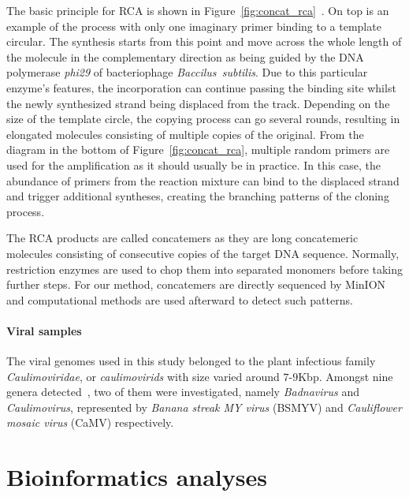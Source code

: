The basic principle for RCA is shown in Figure~\ref{fig:concat_rca}~\cite{Johne2009rca}.
On top is an example of the process with only one imaginary primer binding to a template circular. The synthesis starts from this point and move across the whole length of the molecule in the complementary direction as being guided by the DNA polymerase  \emph{phi29} of bacteriophage \emph{Baccilus~subtilis}.
Due to this particular enzyme's features, the incorporation can continue passing the binding site whilst the newly synthesized strand being displaced from the track.
Depending on the size of the template circle, the copying process can go several rounds, resulting in elongated molecules consisting of multiple copies of the original.
From the diagram in the bottom of Figure~\ref{fig:concat_rca}, multiple random primers are used for the amplification as it should usually be in practice. In this case, the abundance of primers from the reaction mixture can bind to the displaced strand and trigger additional syntheses, creating the branching patterns of the cloning process.

The RCA products are called concatemers as they are long concatemeric molecules consisting of consecutive copies of the target DNA sequence. Normally, restriction enzymes are used to chop them into separated monomers before taking further steps. For our method, concatemers are directly sequenced by MinION and computational methods are used afterward to detect such patterns.
\paragraph{Viral samples}
The viral genomes used in this study belonged to the plant infectious family \emph{Caulimoviridae}, or \emph{caulimovirids} with size varied around $7$-$9$Kbp.
Amongst nine genera detected~\cite{Geering2010ST,Mollov2013LZ}, two of them were investigated, namely \emph{Badnavirus} and \emph{Caulimovirus}, represented by \emph{Banana streak MY virus} (BSMYV) and \emph{Cauliflower mosaic virus} (CaMV) respectively.

\section{Bioinformatics analyses}
